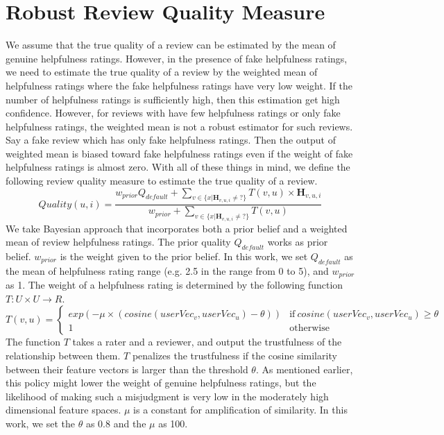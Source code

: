 \documentclass[master,english,final]{kaist-ucs}
\begin{document}
\section{Robust Review Quality Measure}
We assume that the true quality of a review can be estimated by the mean of genuine helpfulness ratings.
However, in the presence of fake helpfulness ratings, we need to estimate the true quality of a review by the weighted mean of helpfulness ratings where the fake helpfulness ratings have very low weight.
If the number of helpfulness ratings is sufficiently high, then this estimation get high confidence.
However, for reviews with have few helpfulness ratings or only fake helpfulness ratings, the weighted mean is not a robust estimator for such reviews.
Say a fake review which has only fake helpfulness ratings.
Then the output of weighted mean is biased toward fake helpfulness ratings even if the weight of fake helpfulness ratings is almost zero.
With all of these things in mind, we define the following review quality measure to estimate the true quality of a review.
\begin{equation}
Quality(u,i) = \frac{ w_{prior} Q_{default} + \sum_{v \in \{x|\bm{H}_{v,u,i} \neq ?\}} T(v,u) \times \bm{H}_{v,u,i} } {w_{prior}  + \sum_{v \in \{x|\bm{H}_{v,u,i} \neq ?\}} T(v,u) }
\end{equation}
We take Bayesian approach that incorporates both a prior belief and a weighted mean of review helpfulness ratings.
The prior quality $Q_{default}$ works as prior belief. 
$w_{prior}$ is the weight given to the prior belief.
In this work, we set $Q_{default}$ as the mean of helpfulness rating range (e.g. 2.5 in the range from 0 to 5), and $w_{prior}$ as 1.
The weight of a helpfulness rating is determined by the following function $T: U \times U \rightarrow R$.
\begin{equation}
T(v,u)=
\begin{cases}
  exp(-\mu \times(cosine(userVec_v,userVec_u)-\theta)) & \text{if}\ cosine(userVec_v,userVec_u) \geq \theta \\
  1 & \text{otherwise}
\end{cases}
\end{equation}
The function $T$ takes a rater and a reviewer, and output the trustfulness of the relationship between them.
$T$ penalizes the trustfulness if the cosine similarity between their feature vectors is larger than the threshold $\theta$.
As mentioned earlier, this policy might lower the weight of genuine helpfulness ratings, but the likelihood of making such a misjudgment is very low in the moderately high dimensional feature spaces.
$\mu$ is a constant for amplification of similarity.
In this work, we set the $\theta$ as 0.8 and the $\mu$ as 100.
\end{document}
